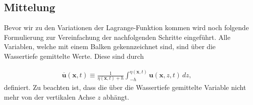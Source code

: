 \subsection{Mittelung}
%
Bevor wir zu den Variationen der Lagrange-Funktion kommen wird noch folgende Formulierung zur Vereinfachung der nachfolgenden Schritte eingeführt.
Alle Variablen, welche mit einem Balken gekennzeichnet sind, sind über die Wassertiefe gemittelte Werte. Diese sind durch

\begin{align}
	\overline{\bm{u}}(\bm{x}, t) \equiv \frac{1}{\eta(\bm{x}, t) + h} \int_{-h}^{\eta(\bm{x},t)} \bm{u}(\bm{x},z,t) \, dz,
	\label{luke:Mittelung_Wassertiefe}
\end{align}
definiert.
Zu beachten ist, dass die über die Wassertiefe gemittelte Variable nicht mehr von der vertikalen Achse $z$ abhängt.

